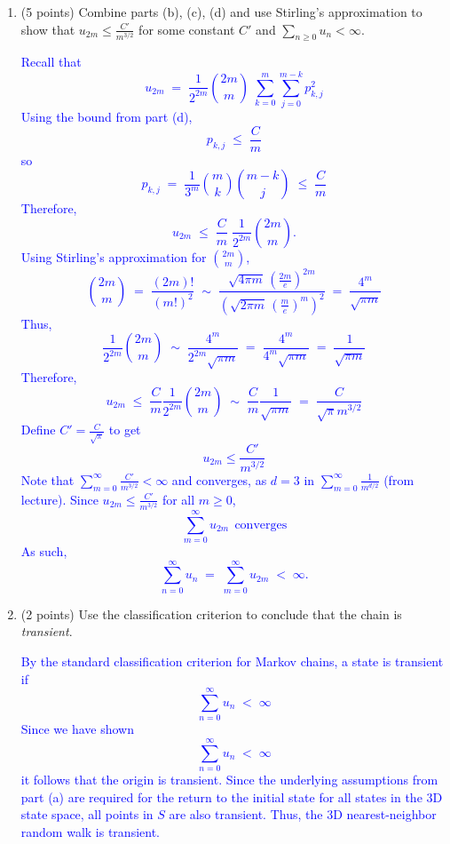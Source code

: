 \documentclass{article}
\begin{document}
\begin{enumerate}[label=(\alph*)]
\item (5 points) Combine parts (b), (c), (d) and use Stirling’s approximation to show that 
$u_{2m} \leq \frac{C'}{m^{3/2}}$
for some constant $C'$ and $\sum_{n \geq 0} u_n < \infty$.

\textcolor{blue}{Recall that
\[
u_{2m} 
\;=\; 
\frac{1}{2^{2m}} \binom{2m}{m} 
\;\sum_{k=0}^m \sum_{j=0}^{m-k} p_{k,j}^2
\]
Using the bound from part (d),
\[
p_{k,j} \;\le\; \frac{C}{m}
\]
so
\[
p_{k,j} \;=\; \frac{1}{3^m}\binom{m}{k}\binom{m-k}{j} \;\le\; \frac{C}{m}
\]
Therefore,
\[
u_{2m}
\;\le\;
\frac{C}{m} 
\;\frac{1}{2^{2m}} \binom{2m}{m}.
\]
Using Stirling's approximation for $\binom{2m}{m}$,
\[
\binom{2m}{m} 
\;=\; 
\frac{(2m)!}{(m!)^2}
\;\sim\;
\frac{\sqrt{4\pi m}\,\left(\frac{2m}{e}\right)^{2m}}{\left(\sqrt{2\pi m}\,\left(\frac{m}{e}\right)^m\right)^2}
\;=\;
\frac{4^m}{\sqrt{\pi m}}
\]
Thus,
\[
\frac{1}{2^{2m}} \binom{2m}{m}
\;\sim\;
\frac{4^m}{2^{2m}\sqrt{\pi m}}
\;=\;
\frac{4^m}{4^m\sqrt{\pi m}}
\;=\;
\frac{1}{\sqrt{\pi m}}
\]
Therefore,
\[
u_{2m}
\;\le\;
\frac{C}{m}
\frac{1}{2^{2m}} \binom{2m}{m}
\;\sim\;
\frac{C}{m}
\frac{1}{\sqrt{\pi m}}
\;=\;
\frac{C}{\sqrt{\pi}m^{3/2}} 
\]
Define $C' = \frac{C}{\sqrt{\pi}}$ to get
$$u_{2m}\leq \frac{C'}{m^{3/2}}$$
Note that $\sum_{m=0}^{\infty}\frac{C'}{m^{3/2}} < \infty$ and converges, as $d = 3$ in $\sum_{m=0}^{\infty}\frac{1}{m^{d/2}}$ (from lecture).
Since $u_{2m} \leq \frac{C'}{m^{3/2}}$ for all $m \geq 0$,
\[
\sum_{m=0}^{\infty} u_{2m} \ \ 
\text{converges} 
\]
As such,
\[
\sum_{n=0}^{\infty} u_n 
\;=\;
\sum_{m=0}^{\infty} u_{2m}
\;<\;
\infty.
\]
}


\item (2 points) Use the classification criterion to conclude that the chain is \textit{transient}.

 \textcolor{blue}{By the standard classification criterion for Markov chains, a state is transient if 
\[
\sum_{n=0}^{\infty} u_n 
\;<\;
\infty
\]
Since we have shown 
\[
\sum_{n=0}^\infty u_n
\;<\;
\infty
\]
it follows that the origin is transient. Since the underlying assumptions from part (a) are required for the return to the initial state for all states in the 3D state space, all points in $S$ are also transient. Thus, the 3D nearest-neighbor random walk is transient.
}

\end{enumerate}
\end{document}
